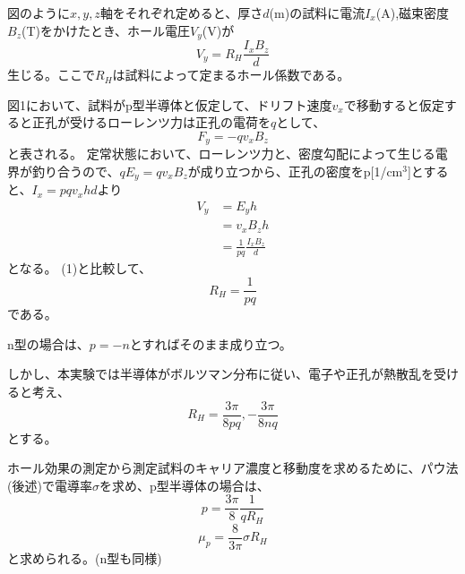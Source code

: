 \documentclass[dvipdfmx]{jsarticle}
\begin{document}
図のように$x,y,z$軸をそれぞれ定めると、厚さ$d$(m)の試料に電流$I_{x}$(A),磁束密度$B_{z}$(T)をかけたとき、ホール電圧$V_{y}$(V)が
\begin{equation}
V_{y} = R_{H}\frac{I_{x}B_{z}}{d}
\end{equation}
生じる。ここで$R_{H}$は試料によって定まるホール係数である。

図1において、試料がp型半導体と仮定して、ドリフト速度$v_{x}$で移動すると仮定すると正孔が受けるローレンツ力は正孔の電荷を$q$として、
\begin{equation}
F_{y} = -qv_{x}B_{z}
\end{equation}
と表される。
定常状態において、ローレンツ力と、密度勾配によって生じる電界が釣り合うので、$qE_{y} = qv_{x}B_{z}$が成り立つから、正孔の密度をp[1/cm$^{3}$]とすると、$I_{x} = pqv_{x}hd$より
\begin{align}
V_{y} &= E_{y}h\\
&= v_{x}B_{z}h\\
&= \frac{1}{pq}\frac{I_{x}B_{z}}{d}
\end{align}
となる。
(1)と比較して、
\begin{equation}
R_{H} = \frac{1}{pq}
\end{equation}
である。

n型の場合は、$p = -n$とすればそのまま成り立つ。

しかし、本実験では半導体がボルツマン分布に従い、電子や正孔が熱散乱を受けると考え、
\begin{equation}
R_{H} = \frac{3\pi}{8pq}, -\frac{3\pi}{8nq}
\end{equation}
とする。

ホール効果の測定から測定試料のキャリア濃度と移動度を求めるために、パウ法(後述)で電導率$\sigma$を求め、p型半導体の場合は、
\begin{equation}
p = \frac{3 \pi }{8}\frac{1}{qR_{H}}
\end{equation}
\begin{equation}
\mu _{p} = \frac{8}{3 \pi} \sigma R_{H}
\end{equation}
と求められる。(n型も同様)
\end{document}
